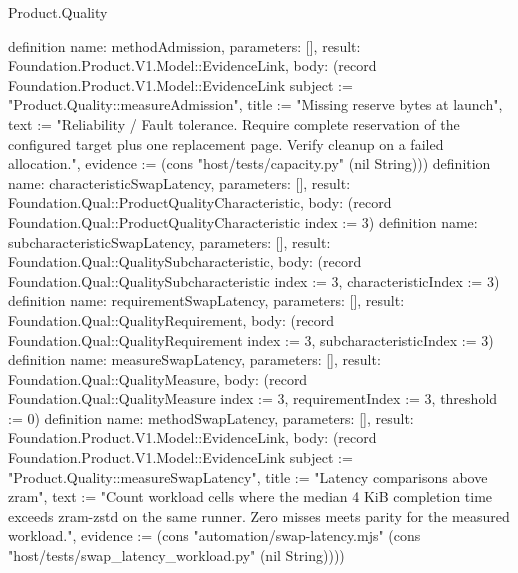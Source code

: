 \begin{lexlean}{Product.Quality}
\begin{semanticmodule}
definition{
  name: methodAdmission, parameters: [], result: Foundation.Product.V1.Model::EvidenceLink,
  body: (record Foundation.Product.V1.Model::EvidenceLink {subject := "Product.Quality::measureAdmission", title := "Missing reserve bytes at launch", text := "Reliability / Fault tolerance. Require complete reservation of the configured target plus one replacement page. Verify cleanup on a failed allocation.", evidence := (cons "host/tests/capacity.py" (nil String))})
}
definition{
  name: characteristicSwapLatency, parameters: [], result: Foundation.Qual::ProductQualityCharacteristic,
  body: (record Foundation.Qual::ProductQualityCharacteristic {index := 3})
}
definition{
  name: subcharacteristicSwapLatency, parameters: [], result: Foundation.Qual::QualitySubcharacteristic,
  body: (record Foundation.Qual::QualitySubcharacteristic {index := 3, characteristicIndex := 3})
}
definition{
  name: requirementSwapLatency, parameters: [], result: Foundation.Qual::QualityRequirement,
  body: (record Foundation.Qual::QualityRequirement {index := 3, subcharacteristicIndex := 3})
}
definition{
  name: measureSwapLatency, parameters: [], result: Foundation.Qual::QualityMeasure,
  body: (record Foundation.Qual::QualityMeasure {index := 3, requirementIndex := 3, threshold := 0})
}
definition{
  name: methodSwapLatency, parameters: [], result: Foundation.Product.V1.Model::EvidenceLink,
  body: (record Foundation.Product.V1.Model::EvidenceLink {subject := "Product.Quality::measureSwapLatency", title := "Latency comparisons above zram", text := "Count workload cells where the median 4 KiB completion time exceeds zram-zstd on the same runner. Zero misses meets parity for the measured workload.", evidence := (cons "automation/swap-latency.mjs" (cons "host/tests/swap_latency_workload.py" (nil String)))})
}
\end{semanticmodule}
\end{lexlean}
